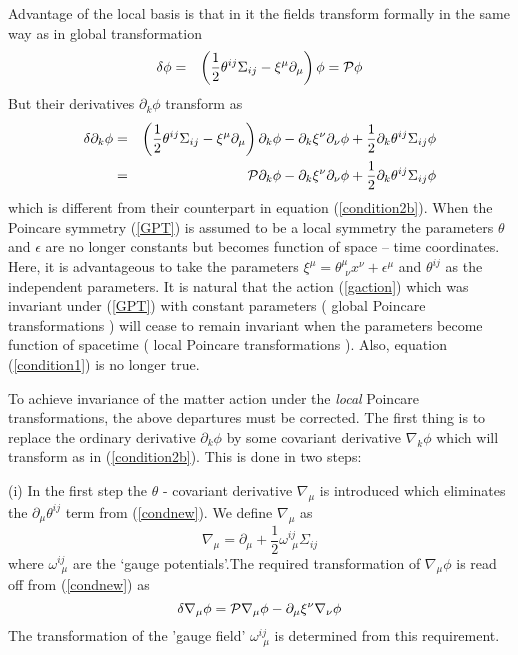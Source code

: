 \documentclass[12pt]{article}
\begin{document}
  Advantage of the local basis is that in it the  fields transform formally in the same way as in global transformation
 \begin{eqnarray}
\delta\phi &=& \left(\frac{1}{2}\theta^{ij}\Sigma_{ij} - \xi^\mu\partial_\mu\right) \phi\nonumber
           ={\cal{P}}\phi
\end{eqnarray}
But 
  their derivatives $\partial_k\phi$ transform as
\begin{eqnarray}
\delta\partial_k\phi &=& \left(\frac{1}{2}\theta^{ij}\Sigma_{ij} - \xi^\mu\partial_\mu\right)\partial_k\phi - \partial_k\xi^\nu\partial_\nu\phi + \frac{1}{2}\partial_k\theta^{ij}\Sigma_{ij}\phi\nonumber\\
           &=& {\cal{P}}\partial_k\phi - \partial_k\xi^\nu\partial_\nu\phi + \frac{1}{2}\partial_k\theta^{ij}\Sigma_{ij}\phi\label{condnew} 
\end{eqnarray}
which is different from their counterpart in equation (\ref{condition2b}).
  When the Poincare symmetry (\ref{GPT}) is assumed to be a local symmetry the parameters $\theta$ and $\epsilon$ are no longer constants but becomes function of space -- time coordinates.  
 Here, it is advantageous to take the  parameters  $\xi^\mu = \theta^\mu_{\ \,\nu} x^\nu +  \epsilon^\mu$ and $\theta^{ij}$ as the independent parameters. It is natural that the action (\ref{gaction}) which was invariant under (\ref{GPT}) with constant parameters ( global Poincare transformations ) will cease to remain invariant when the parameters become function of spacetime ( local Poincare transformations ). Also, equation (\ref{condition1}) is no longer true.

 To achieve invariance of the matter action under the {\it{local}} Poincare transformations, the above departures must be corrected. The first thing is to replace the ordinary derivative $\partial_k\phi$ by some covariant derivative $\nabla_k\phi$ which will transform  as in (\ref{condition2b}).
 This is done in two steps:

(i) In the first step the $\theta$ - covariant derivative $\nabla_\mu$ is introduced which eliminates the $\partial_\mu\theta^{ij}$ term from (\ref{condnew}). We define  $\nabla_\mu$ as
\begin{equation}
\nabla_\mu = \partial_{\mu} + \frac{1}{2}\omega^{ij}_{\ \ \mu}\Sigma_{ij}\label{nablamu}
\end{equation}
where $\omega^{ij}_{\ \ \mu}$ are the `gauge potentials'.The required transformation of $\nabla_\mu\phi$ is read off from (\ref{condnew}) as
\begin{equation}
\delta\nabla_\mu\phi = {\cal{P}}\nabla_{\mu}\phi -\partial_\mu \xi^{\nu}\nabla_\nu\phi
\end{equation}
The transformation of the 'gauge field' 
$\omega^{ij}_{\ \ \mu}$ is determined from this requirement.
\end{document}
